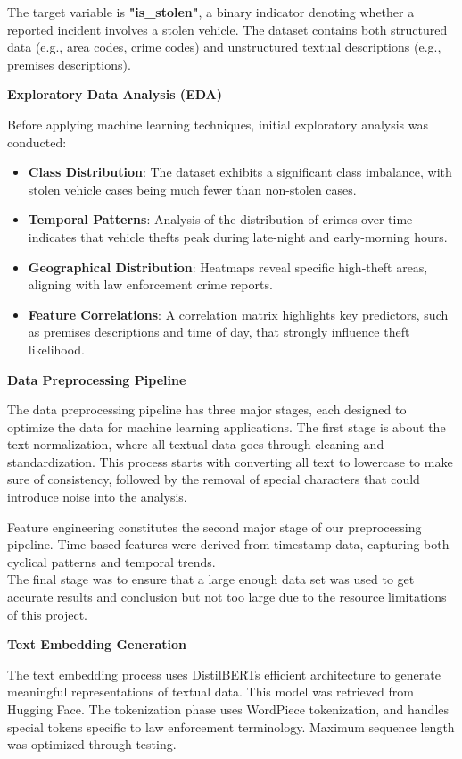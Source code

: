 \documentclass[
]{article}
\begin{document}
The target variable is \textbf{"is\_stolen"}, a binary indicator
denoting whether a reported incident involves a stolen vehicle. The
dataset contains both structured data (e.g., area codes, crime codes)
and unstructured textual descriptions (e.g., premises descriptions).

\textbf{Exploratory Data Analysis (EDA)}

Before applying machine learning techniques, initial exploratory
analysis was conducted:

\begin{itemize}
\item
  \textbf{Class Distribution}: The dataset exhibits a significant class
  imbalance, with stolen vehicle cases being much fewer than non-stolen
  cases.
\item
  \textbf{Temporal Patterns}: Analysis of the distribution of crimes
  over time indicates that vehicle thefts peak during late-night and
  early-morning hours.
\item
  \textbf{Geographical Distribution}: Heatmaps reveal specific
  high-theft areas, aligning with law enforcement crime reports.
\item
  \textbf{Feature Correlations}: A correlation matrix highlights key
  predictors, such as premises descriptions and time of day, that
  strongly influence theft likelihood.
\end{itemize}

\textbf{Data Preprocessing Pipeline}

The data preprocessing pipeline has three major stages, each designed to
optimize the data for machine learning applications. The first stage is
about the text normalization, where all textual data goes through
cleaning and standardization. This process starts with converting all
text to lowercase to make sure of consistency, followed by the removal
of special characters that could introduce noise into the analysis.

Feature engineering constitutes the second major stage of our
preprocessing pipeline. Time-based features were derived from timestamp
data, capturing both cyclical patterns and temporal trends.\\
The final stage was to ensure that a large enough data set was used to
get accurate results and conclusion but not too large due to the
resource limitations of this project.

\textbf{Text Embedding Generation}

The text embedding process uses DistilBERT\textquotesingle s efficient
architecture to generate meaningful representations of textual data.
This model was retrieved from Hugging Face. The tokenization phase uses
WordPiece tokenization, and handles special tokens specific to law
enforcement terminology. Maximum sequence length was optimized through
testing.
\end{document}
